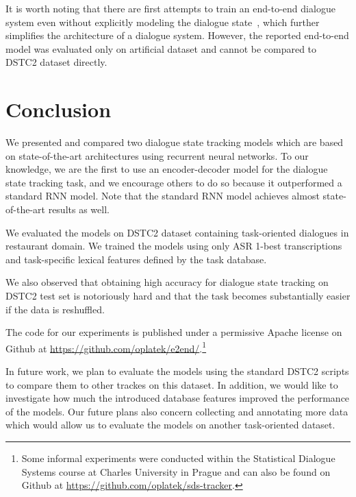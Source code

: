 \documentclass{itatnew}
\begin{document}
It is worth noting that there are first attempts to train an end-to-end dialogue system even without explicitly modeling the dialogue state~\cite{bordes2016learning}, which further simplifies the architecture of a dialogue system.
However, the reported end-to-end model was evaluated only on artificial dataset and cannot be compared to DSTC2 dataset directly.

\section{Conclusion}
\label{sec:conc}

We presented and compared two dialogue state tracking models which are based on state-of-the-art architectures using recurrent neural networks.
To our knowledge, we are the first to use an encoder-decoder model for the dialogue state tracking task, and we encourage others to do so because it outperformed a standard RNN model. 
Note that the standard RNN model achieves almost state-of-the-art results as well.

We evaluated the models on DSTC2 dataset containing task-oriented dialogues in restaurant domain. 
We trained the models using only ASR 1-best transcriptions and task-specific lexical features defined by the task database.

We also observed that obtaining high accuracy for dialogue state tracking on DSTC2 test set is notoriously hard and that the task becomes substantially easier if the data is reshuffled.

The code for our experiments is published under a permissive Apache license on Github at \url{https://github.com/oplatek/e2end/}.\footnote{Some informal experiments were conducted  within the Statistical Dialogue Systems course at Charles University in Prague and can also be  found on Github at \url{https://github.com/oplatek/sds-tracker}.}

In future work, we plan to evaluate the models using the standard DSTC2 scripts to compare them to other trackes on this dataset.
In addition, we would like to investigate how much the introduced database features improved the performance of the models.
Our future plans also concern collecting and annotating more data which would allow us to evaluate the models on another task-oriented dataset.
\end{document}
